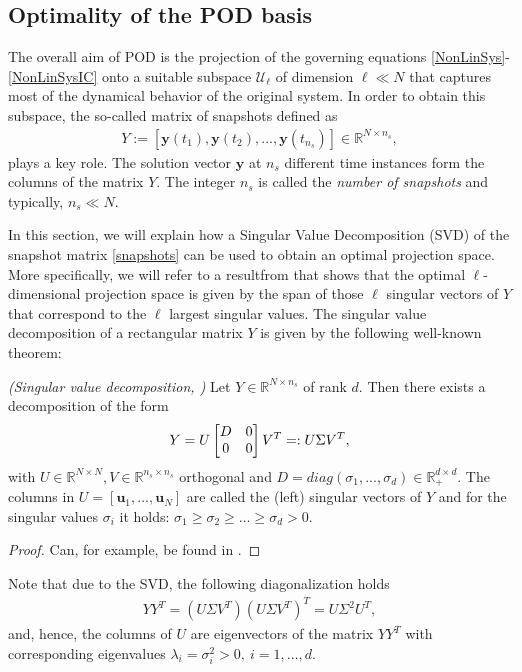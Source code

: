 \subsection{Optimality of the POD basis}
The overall aim of POD is the projection of the governing equations \eqref{NonLinSys}-\eqref{NonLinSysIC} onto a suitable subspace $\mathcal{U}_\ell$ of dimension $\ell \ll N$ that captures most of the dynamical behavior of the original system. In order to obtain this subspace, the so-called matrix of snapshots defined as
\begin{align}
\label{snapshots}
Y := [\mathbf{y}(t_1), \mathbf{y}(t_2), ..., \mathbf{y}(t_{n_s})] \in \mathbb{R}^{N \times n_s},
\end{align}
plays a key role. The solution vector $\mathbf{y}$ at $n_s$ different time instances form the columns of the matrix $Y$. The integer $n_s$ is called the \textit{number of snapshots} and typically, $n_s \ll N$.

In this section, we will explain how a Singular Value Decomposition (SVD) of the snapshot matrix \eqref{snapshots} can be used to obtain an optimal projection space. More specifically, we will refer to a resultfrom \cite{V11} that shows that the optimal $\ell$-dimensional projection space is given by the span of those $\ell$ singular vectors of $Y$ that correspond to the $\ell$ largest singular values. The singular value decomposition of a rectangular matrix $Y$ is given by the following well-known theorem:
\begin{theorem}
\emph{(Singular value decomposition, \cite{G96})}
\label{svdthm}
Let $Y \in \mathbb{R}^{N \times n_s}$ of rank $d$. Then there exists a decomposition of the form
\begin{align}
\label{svd}
Y = U \begin{bmatrix} D & 0 \\ 0 & 0 \end{bmatrix} V^T =: U \Sigma V^T,
\end{align}
with $U \in \mathbb{R}^{N \times N}, V \in \mathbb{R}^{n_s \times n_s}$ orthogonal and $D = diag(\sigma_1,...,\sigma_d) \in \mathbb{R}_+^{d \times d}$. The columns in $U = [\mathbf{u}_1,...,\mathbf{u}_N]$ are called the (left) singular vectors of $Y$ and for the singular values $\sigma_i$ it holds: $\sigma_1 \geq \sigma_2 \geq ... \geq \sigma_d > 0$.
\end{theorem}
\begin{proof}
Can, for example, be found in \cite[Theorem 2.5.2]{G96}.
\end{proof}
Note that due to the SVD, the following diagonalization holds
\begin{align}
\label{SVDalsEW}
Y Y^T = (U \Sigma V^T) (U \Sigma V^T)^T = U \Sigma^2 U^T,
\end{align}
and, hence, the columns of $U$ are eigenvectors of the matrix $Y Y^T$ with corresponding eigenvalues $\lambda_i = \sigma_i^2 > 0, \ i=1,...,d$.

